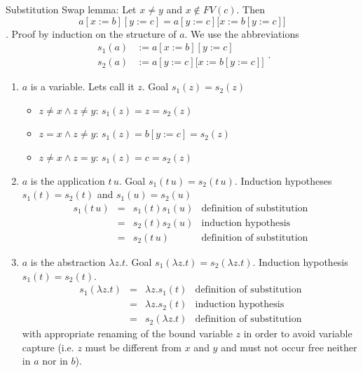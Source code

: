 \begin{theorem}
  \label{substitutionswap}
  Substitution Swap lemma: Let $x \ne y$ and $x \notin
  FV(c)$. Then $$a[x:=b][y:=c] = a[y:=c]\big[x:= b[y:=c]\big]$$. Proof by
  induction on the structure of $a$. We use the abbreviations
  $$\begin{array}{ll}
      s_1(a) &:= a[x:=b][y:=c] \\
      s_2(a) &:= a[y:=c]\big[x:=b[y:=c]\big]
    \end{array}.$$
  \begin{enumerate}

  \item $a$ is a variable. Lets call it $z$. Goal $s_1(z) = s_2(z)$
    \begin{itemize}
    \item $z \ne x \land z \ne y$: $s_1(z) = z = s_2(z)$
    \item $z = x \land z \ne y$: $s_1(z) = b[y:=c] = s_2(z)$
    \item $z \ne x \land z = y$: $s_1(z) = c = s_2(z)$
    \end{itemize}

  \item $a$ is the application $t\, u$. Goal $s_1(t\,u) = s_2(t\,u)$.
    Induction hypotheses $s_1(t) = s_2(t)$ and $s_1(u) = s_2(u)$
    $$\begin{array}{llll}
        s_1(t\,u) &=& s_1(t) s_1(u) & \text{definition of substitution}\\
       &=& s_2(t) s_2(u) & \text{induction hypothesis}\\
        &=& s_2(t\,u) & \text{definition of substitution}
      \end{array}$$

    \item $a$ is the abstraction $\lambda z.t$. Goal $s_1(\lambda z.t) =
      s_2(\lambda z.t)$. Induction hypothesis $s_1(t) = s_2(t)$.
    $$\begin{array}{llll}
        s_1(\lambda z. t) &=& \lambda z. s_1(t)  & \text{definition of substitution}\\
       &=& \lambda z. s_2(t) & \text{induction hypothesis}\\
        &=& s_2(\lambda z.t) & \text{definition of substitution}
      \end{array}$$
      with appropriate renaming of the bound variable $z$ in order to avoid
      variable capture (i.e. $z$ must be different from $x$ and $y$ and must
      not occur free neither in $a$ nor in $b$).
  \end{enumerate}
\end{theorem}




